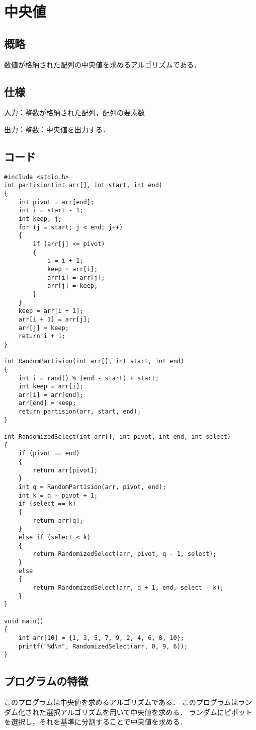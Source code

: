 \documentclass{ltjsarticle}
\begin{document}
\section{中央値}
\subsection{概略}
数値が格納された配列の中央値を求めるアルゴリズムである．
\subsection{仕様}
\noindent 入力：整数が格納された配列，配列の要素数

\noindent 出力：整数：中央値を出力する．
\subsection{コード}
\begin{lstlisting}[frame=single, lineskip=-5pt]
#include <stdio.h>
int partision(int arr[], int start, int end)
{
    int pivot = arr[end];
    int i = start - 1;
    int keep, j;
    for (j = start; j < end; j++)
    {
        if (arr[j] <= pivot)
        {
            i = i + 1;
            keep = arr[i];
            arr[i] = arr[j];
            arr[j] = keep;
        }
    }
    keep = arr[i + 1];
    arr[i + 1] = arr[j];
    arr[j] = keep;
    return i + 1;
}

int RandomPartision(int arr[], int start, int end)
{
    int i = rand() % (end - start) + start;
    int keep = arr[i];
    arr[i] = arr[end];
    arr[end] = keep;
    return partision(arr, start, end);
}

int RandomizedSelect(int arr[], int pivot, int end, int select)
{
    if (pivot == end)
    {
        return arr[pivot];
    }
    int q = RandomPartision(arr, pivot, end);
    int k = q - pivot + 1;
    if (select == k)
    {
        return arr[q];
    }
    else if (select < k)
    {
        return RandomizedSelect(arr, pivot, q - 1, select);
    }
    else
    {
        return RandomizedSelect(arr, q + 1, end, select - k);
    }
}

void main()
{
    int arr[10] = {1, 3, 5, 7, 9, 2, 4, 6, 8, 10};
    printf("%d\n", RandomizedSelect(arr, 0, 9, 6));
}
\end{lstlisting}

\subsection{プログラムの特徴}
このプログラムは中央値を求めるアルゴリズムである．
このプログラムはランダム化された選択アルゴリズムを用いて中央値を求める．
ランダムにピボットを選択し，それを基準に分割することで中央値を求める．
\end{document}
